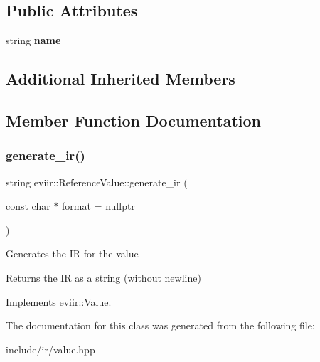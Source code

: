 \subsection*{Public Attributes}
\begin{DoxyCompactItemize}
\item 
\mbox{\label{classeviir_1_1ReferenceValue_a85868eceda63d8196653fee17207a16a}} 
string {\bfseries name}
\end{DoxyCompactItemize}
\subsection*{Additional Inherited Members}


\subsection{Member Function Documentation}
\mbox{\label{classeviir_1_1ReferenceValue_a7b03ad70c7253d44fb7061a91751f9f6}} 
\subsubsection{\texorpdfstring{generate\+\_\+ir()}{generate\_ir()}}
{\footnotesize\ttfamily string eviir\+::\+Reference\+Value\+::generate\+\_\+ir (\begin{DoxyParamCaption}\item[{const char $\ast$}]{format = {\ttfamily nullptr} }\end{DoxyParamCaption})\hspace{0.3cm}{\ttfamily [virtual]}}

Generates the IR for the value \begin{DoxyReturn}{Returns}
the IR as a string (without newline) 
\end{DoxyReturn}


Implements \hyperlink{classeviir_1_1Value_a0613bf660425df31e230681555f64dea}{eviir\+::\+Value}.



The documentation for this class was generated from the following file\+:\begin{DoxyCompactItemize}
\item 
include/ir/value.\+hpp\end{DoxyCompactItemize}
